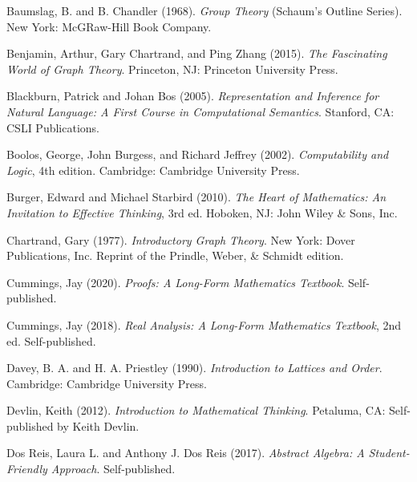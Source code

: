 \documentclass[../../../main.tex]{subfiles}
\begin{document}

\begin{thebibliography}{99}

  Baumslag, B. and B. Chandler (1968).
  \emph{Group Theory} (Schaum's Outline Series).
  New York: McGRaw-Hill Book Company.
  
  Benjamin, Arthur, Gary Chartrand, and Ping Zhang (2015).
  \emph{The Fascinating World of Graph Theory}.
  Princeton, NJ: Princeton University Press.

  Blackburn, Patrick and Johan Bos (2005).
  \emph{Representation and Inference for Natural Language: A First Course in Computational Semantics}.
  Stanford, CA: CSLI Publications.
  
  Boolos, George, John Burgess, and Richard Jeffrey (2002).
  \emph{Computability and Logic}, 4th edition.
  Cambridge: Cambridge University Press.

  Burger, Edward and Michael Starbird (2010).
  \emph{The Heart of Mathematics: An Invitation to Effective Thinking}, 3rd ed.
  Hoboken, NJ: John Wiley \& Sons, Inc.

  Chartrand, Gary (1977).
  \emph{Introductory Graph Theory}.
  New York: Dover Publications, Inc. Reprint of the Prindle, Weber, \& Schmidt edition.
  
  Cummings, Jay (2020).
  \emph{Proofs: A Long-Form Mathematics Textbook}.
  Self-published.
  
  Cummings, Jay (2018).
  \emph{Real Analysis: A Long-Form Mathematics Textbook}, 2nd ed.
  Self-published.

  Davey, B. A. and H. A. Priestley (1990).
  \emph{Introduction to Lattices and Order}.
  Cambridge: Cambridge University Press.

  Devlin, Keith (2012).
  \emph{Introduction to Mathematical Thinking}.
  Petaluma, CA: Self-published by Keith Devlin.

  Dos Reis, Laura L. and Anthony J. Dos Reis (2017).
  \emph{Abstract Algebra: A Student-Friendly Approach}.
  Self-published.
  

\end{thebibliography}
\end{document}
